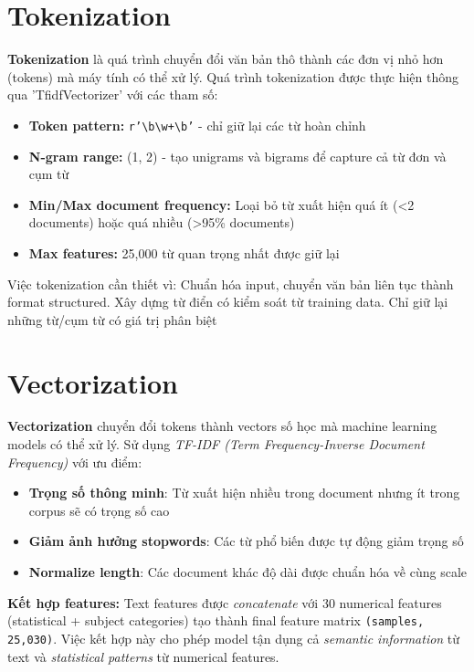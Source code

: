 \section{Tokenization}

\textbf{Tokenization} là quá trình chuyển đổi văn bản thô thành các đơn vị nhỏ hơn (tokens) mà máy tính có thể xử lý. Quá trình tokenization được thực hiện thông qua 'TfidfVectorizer' với các tham số:

\begin{itemize}
    \item \textbf{Token pattern:} \texttt{r'\textbackslash b\textbackslash w+\textbackslash b'} - chỉ giữ lại các từ hoàn chỉnh
    \item \textbf{N-gram range:} (1, 2) - tạo unigrams và bigrams để capture cả từ đơn và cụm từ
    \item \textbf{Min/Max document frequency:} Loại bỏ từ xuất hiện quá ít (<2 documents) hoặc quá nhiều (>95\% documents)
    \item \textbf{Max features:} 25,000 từ quan trọng nhất được giữ lại
\end{itemize}

\noindent Việc tokenization cần thiết vì: Chuẩn hóa input, chuyển văn bản liên tục thành format structured. Xây dựng từ điển có kiểm soát từ training data. Chỉ giữ lại những từ/cụm từ có giá trị phân biệt

\section{Vectorization}

\textbf{Vectorization} chuyển đổi tokens thành vectors số học mà machine learning models có thể xử lý. Sử dụng \textit{TF-IDF (Term Frequency-Inverse Document Frequency)} với ưu điểm:

\begin{itemize}
    \item \textbf{Trọng số thông minh}: Từ xuất hiện nhiều trong document nhưng ít trong corpus sẽ có trọng số cao
    \item \textbf{Giảm ảnh hưởng stopwords}: Các từ phổ biến được tự động giảm trọng số
    \item \textbf{Normalize length}: Các document khác độ dài được chuẩn hóa về cùng scale
\end{itemize}

\noindent\textbf{Kết hợp features:}
Text features được \textit{concatenate} với 30 numerical features (statistical + subject categories) tạo thành final feature matrix \texttt{(samples, 25,030)}. Việc kết hợp này cho phép model tận dụng cả \textit{semantic information} từ text và \textit{statistical patterns} từ numerical features.

